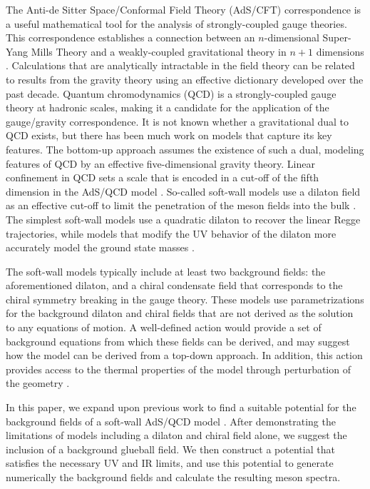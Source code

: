 \documentclass[aps,prd,12pt,nofootinbib]{revtex4}
\begin{document}
The Anti-de Sitter Space/Conformal Field Theory (AdS/CFT) correspondence is a useful mathematical tool for the analysis of strongly-coupled gauge theories.
This correspondence establishes a connection between an $n$-dimensional Super-Yang Mills Theory and a weakly-coupled gravitational theory in $n+1$ dimensions \cite{maldacena, Gubser1998, Witten:1998}. 
Calculations that are analytically intractable in the field theory can be related to results from the gravity theory using an effective dictionary developed over the past decade. 
Quantum chromodynamics (QCD) is a strongly-coupled gauge theory at hadronic scales, making it a candidate for the application of the gauge/gravity correspondence.
It is not known whether a gravitational dual to QCD exists, but there has been much work on models that capture its key features.
The bottom-up approach assumes the existence of such a dual, modeling features of QCD by an effective five-dimensional gravity theory.
Linear confinement in QCD sets a scale that is encoded in a cut-off of the fifth dimension in the AdS/QCD model \cite{stephanov-katz-son, DaRold2005}. 
So-called soft-wall models use a dilaton field as an effective cut-off to limit the penetration of the meson fields into the bulk \cite{karch-katz-son-adsqcd}. 
The simplest soft-wall models use a quadratic dilaton to recover the linear Regge trajectories, while models that modify the UV behavior of the dilaton more accurately model the ground state masses \cite{gherghetta-kelley, bartz-pions, Colangelo2008, Cui2013}.

The soft-wall models typically include at least two background fields: the aforementioned dilaton, and a chiral condensate field that corresponds to the chiral symmetry breaking in the gauge theory.
These models use parametrizations for the background dilaton and chiral fields that are not derived as the solution to any equations of motion. 
A well-defined action would provide a set of background equations from which these fields can be derived, and may suggest how the model can be derived from a top-down approach. 
In addition, this action provides access to the thermal properties of the model through perturbation of the geometry \cite{Herzog2007, Bayona2008, Gursoy2008b}.

In this paper, we expand upon previous work to find a suitable potential for the background fields of a soft-wall AdS/QCD model \cite{Batell2008, Springer2010, Gursoy2008a, Gursoy2008b, Csaki2007, Li2013, Li2013a, He2013}. 
After demonstrating the limitations of models including a dilaton and chiral field alone, we suggest the inclusion of a background glueball field. 
We then construct a potential that satisfies the necessary UV and IR limits, and use this potential to generate numerically the background fields and calculate the resulting meson spectra.
\end{document}
